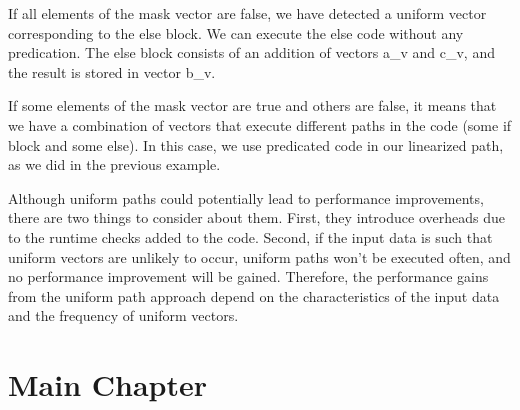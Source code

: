 \documentclass[\main/thesis.tex]{subfiles}
\begin{document}
If all elements of the mask vector are false, we have detected a uniform vector corresponding to the else block. We can execute the else code without any predication. The else block consists of an addition of vectors a\_v and c\_v, and the result is stored in vector b\_v.

If some elements of the mask vector are true and others are false, it means that we have a combination of vectors that execute different paths in the code (some if block and some else). In this case, we use predicated code in our linearized path, as we did in the previous example.

Although uniform paths could potentially lead to performance improvements, there are two things to consider about them. First, they introduce overheads due to the runtime checks added to the code. Second, if the input data is such that uniform vectors are unlikely to occur, uniform paths won't be executed often, and no performance improvement will be gained. Therefore, the performance gains from the uniform path approach depend on the characteristics of the input data and the frequency of uniform vectors.


\chapter{Main Chapter}



\end{document}
